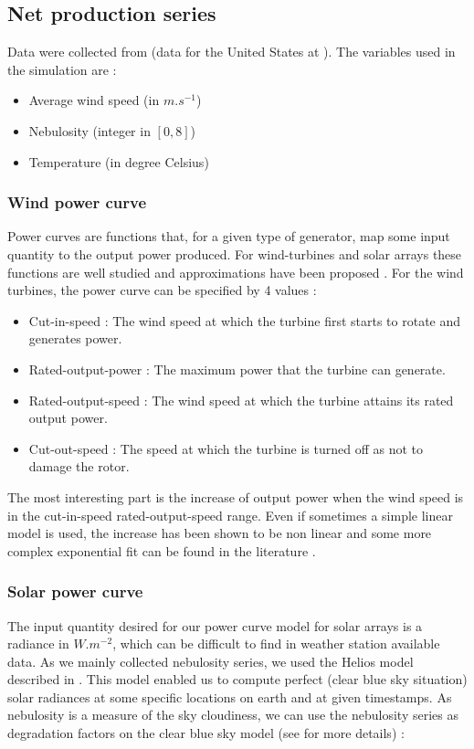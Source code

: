 \documentclass[journal]{IEEEtran}
\begin{document}
\subsection{Net production series}
\label{appendixB}

Data were collected from \cite{Infoclimat} (data for the United States at \cite{NCDC}). The variables used in the simulation are :

\begin{itemize}
\item Average wind speed (in $m.s^{-1}$)
\item Nebulosity (integer in $[0,8] $)
\item Temperature (in degree Celsius)
\end{itemize} 

\subsubsection{Wind power curve}
Power curves are functions that, for a given type of generator, map some input quantity to the output power produced. For wind-turbines and solar arrays these functions are well studied and approximations have been proposed \cite{Lydia2014} \cite{Piedallu2007, Piedallu2008}. For the wind turbines, the power curve can be specified by 4 values :

\begin{itemize}
\item Cut-in-speed : The wind speed at which the turbine first starts to rotate and generates power.
\item Rated-output-power : The maximum power that the turbine can generate.
\item Rated-output-speed : The wind speed at which the turbine attains its rated output power.
\item Cut-out-speed : The speed at which the turbine is turned off as not to damage the rotor.
\end{itemize}

The most interesting part is the increase of output power when the wind speed is in the cut-in-speed rated-output-speed range. Even if sometimes a simple linear model is used, the increase has been shown to be non linear and some more complex exponential fit can be found in the literature \cite{Lydia2014}.

\subsubsection{Solar power curve}
The input quantity desired for our power curve model for solar arrays is a radiance in $ W.m^{-2} $, which can be difficult to find in weather station available data. As we mainly collected nebulosity series, we used the Helios model described in \cite{Piedallu2007, Piedallu2008}. This model enabled us to compute perfect (clear blue sky situation) solar radiances at some specific locations on earth and at given timestamps. As nebulosity is a measure of the sky cloudiness, we can use the nebulosity series as degradation factors on the clear blue sky model (see \cite{Piedallu2007, Piedallu2008} for more details) :
\end{document}
